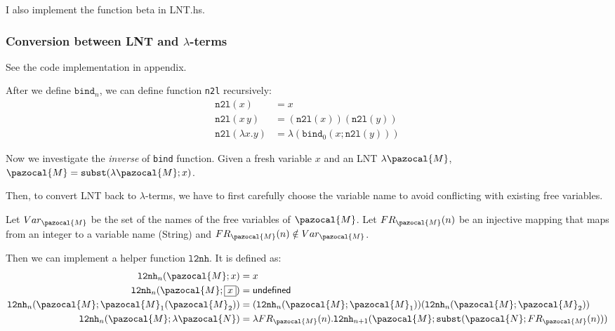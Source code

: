 \documentclass{article}
\theoremstyle{definition}
\newcommand{\lb}{$\lambda$}
\begin{document}
I also implement the function \textsf{beta} in \textsf{LNT.hs}.

\subsubsection*{Conversion between LNT and \lb-terms}

See the code implementation in appendix.

After we define $\mathtt{bind}_n$, we can define function \texttt{n2l} recursively:
\begin{align*}
    \mathtt{n2l}(x)           & = x                                            \\
    \mathtt{n2l}(x\, y)       & = (\mathtt{n2l}(x))(\mathtt{n2l}(y))           \\
    \mathtt{n2l}(\lambda x.y) & = \lambda (\mathtt{bind}_0(x;\mathtt{n2l}(y)))
\end{align*}

Now we investigate the \emph{inverse} of \texttt{bind} function.
Given a fresh variable $x$ and an LNT $\lambda\pazocal{M}$, $\pazocal{M} = \mathtt{subst}(\lambda \pazocal{M};x)$.

Then, to convert LNT back to \lb-terms, we have to first carefully choose the variable name to avoid conflicting with existing free variables.

Let $Var_\pazocal{M}$ be the set of the names of the free variables of $\pazocal{M}$.
Let $FR_\pazocal{M}(n)$ be an injective mapping that maps from an integer to a variable name (String) and $FR_\pazocal{M}(n)\notin Var_\pazocal{M}$.

Then we can implement a helper function $\mathtt{l2nh}$.
It is defined as:
\begin{align*}
    \mathtt{l2nh}_n(\pazocal{M};x)                            & = x                                                                                                          \\
    \mathtt{l2nh}_n(\pazocal{M};\fbox{$x$})                   & = \textsf{undefined}                                                                                         \\
    \mathtt{l2nh}_n(\pazocal{M};\pazocal{M}_1(\pazocal{M}_2)) & = (\mathtt{l2nh}_n(\pazocal{M};\pazocal{M}_1))(\mathtt{l2nh}_n(\pazocal{M};\pazocal{M}_2))                   \\
    \mathtt{l2nh}_n(\pazocal{M};\lambda \pazocal{N})          & = \lambda FR_\pazocal{M}(n).\mathtt{l2nh}_{n+1}(\pazocal{M};\mathtt{subst}(\pazocal{N}; FR_\pazocal{M} (n))) \\
\end{align*}
\end{document}
